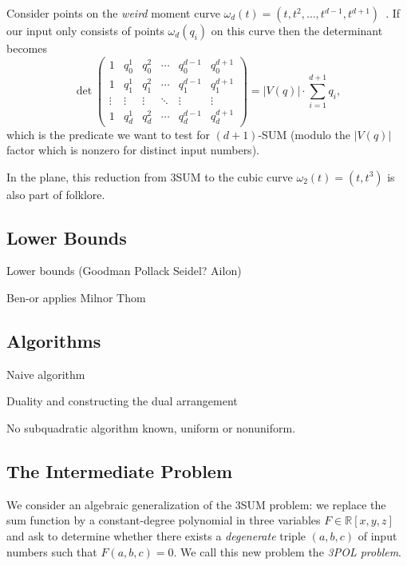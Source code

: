 Consider points on the \emph{weird} moment curve $\omega_d(t) = (t, t^2, \ldots,
t^{d-1}, t^{d+1})$~\cite{Er99b}.
If our input only consists of points $\omega_d(q_i)$ on this curve then the
determinant becomes
%
\begin{displaymath}
\det\begin{pmatrix}
1      & q_0^1 & q_0^2 & \cdots & q_0^{d-1} & q_0^{d+1} \\
1      & q_1^1 & q_1^2 & \cdots & q_1^{d-1} & q_1^{d+1} \\
\vdots & \vdots  & \vdots  & \ddots & \vdots & \vdots  \\
1      & q_d^1 & q_d^2 & \cdots & q_d^{d-1} & q_d^{d+1}
\end{pmatrix} = |V(q)| \cdot \sum_{i=1}^{d+1} q_i,
\end{displaymath}
%
which is the predicate we want to test for $(d+1)$-SUM (modulo the $|V(q)|$
factor which is nonzero for distinct input numbers).

In the plane, this reduction from 3SUM to the cubic curve \(\omega_2(t) = (t,
t^3)\) is also part of folklore.

\subsection{Lower Bounds}

Lower bounds (Goodman Pollack Seidel? Ailon)

Ben-or applies Milnor Thom

\subsection{Algorithms}

Naive algorithm

Duality and constructing the dual arrangement

No subquadratic algorithm known, uniform or nonuniform.

\subsection{The Intermediate Problem}

We consider an algebraic generalization of the 3SUM problem: we replace the sum
function by a constant-degree polynomial in three variables $F \in
\mathbb{R}[x,y,z]$ and ask to determine whether there exists a
\emph{degenerate} triple $(a,b,c)$ of input numbers such that $F(a,b,c)=0$. We
call this new problem the \emph{3POL problem}.

